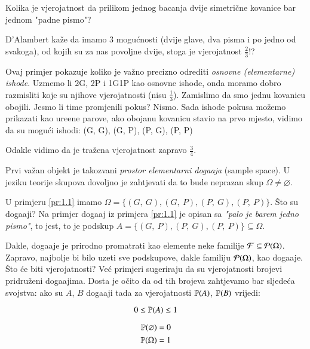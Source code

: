 \begin{pr}[D'Alambert 1754] \label{pr:1.1}
    Kolika je vjerojatnost da prilikom jednog bacanja dvije simetri\v cne kovanice bar jednom "padne pismo"?
\end{pr}

\begin{rj}
    D'Alambert ka\v ze da imamo 3 mogu\' cnosti (dvije glave,
    dva pisma i po jedno od svakoga), od kojih su za nas povoljne
    dvije, stoga je vjerojatnost $\frac{2}{3}$!?
    
    Ovaj primjer pokazuje koliko je va\v zno precizno odrediti \emph{osnovne (elementarne) ishode}.
    Uzmemo li 2G, 2P i 1G1P kao osnovne ishode, onda moramo dobro razmisliti koje su njihove vjerojatnosti (nisu $\frac{1}{3}$). Zamislimo da smo jednu kovanicu obojili.
    Jesmo li time promjenili pokus?
    Nismo.
    Sada ishode pokusa mo\v zemo prikazati kao ure\dj ene parove, ako obojanu kovanicu stavio na prvo mjesto, vidimo da su mogu\' ci ishodi:
    (G, G), (G, P), (P, G), (P, P)
    
    Odakle vidimo da je tra\v zena vjerojatnost zapravo $\frac{3}{4}$.
\end{rj}

Prvi va\v zan objekt je takozvani \emph{prostor elementarni doga\dj aja} (sample space).
U jeziku teorije skupova dovoljno je zahtjevati da to bude neprazan skup $\Omega \neq \varnothing$.

U primjeru \ref{pr:1.1} imamo $ \Omega = \{(G, \: G), (G, \: P), (P, \: G), (P, \: P)\}$.
\v Sto su doga\dj aji?
Na primjer doga\dj aj iz primjera \ref{pr:1.1} je opisan sa \emph{"palo je barem jedno pismo"}, to jest, to je podskup $A = \{(G, \: P),(P, \: G), (P, \: P)\} \subseteq \Omega$.

Dakle, doga\dj aje je prirodno promatrati kao elemente neke familije $\mathcal{F} \subseteq \mathcal{P}({\Omega})$.
Zapravo, najbolje bi bilo uzeti sve podskupove, dakle familiju $\mathcal{P}({\Omega})$, kao doga\dj aje.
\v Sto \' ce biti vjerojatnosti?
Ve\' c primjeri sugeriraju da su vjerojatnosti brojevi pridru\v zeni doga\dj ajima.
Dosta je o\v cito da od tih brojeva zahtjevamo bar sljede\' ca svojstva: ako su $A$, $B$ doga\dj aji tada za vjerojatnosti $\mathbb{P}({A})$, $\mathbb{P}({B})$ vrijedi:

\begin{equation} \label{jed:1.2}
    0 \leq \mathbb{P}({A}) \leq 1
\end{equation}

\begin{align} \label{jed:1.3}
    \begin{split}
        \mathbb{P}({\varnothing}) &= 0 \\
        \mathbb{P}({\Omega}) &= 1
    \end{split}
\end{align}

